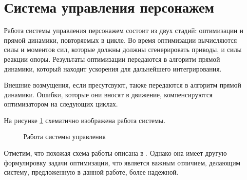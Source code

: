 
\section{Система управления персонажем}

Работа системы управления персонажем состоит из двух стадий: оптимизации и прямой динамики, повторяемых в цикле. Во время оптимизации вычисляются силы и моментов сил, которые должны должны сгенерировать приводы, и силы реакции опоры. Результаты оптимизации передаются в алгоритм прямой динамики, который находит ускорения для дальнейшего интегрирования.

Внешние возмущения, если пресутсвуют, также передаются в алгоритм прямой динамики. Ошибки, которые они вносят в движение, компенсируются оптимизатором на следующих циклах.

На рисунке \ref{fig:architecture} схематично изображена работа системы.

\begin{figure}[h]
  \begin{minipage}{\textwidth}
    \centering
    \caption{Работа системы управления}
    \label{fig:architecture}
  \end{minipage}
\end{figure}

Отметим, что похожая схема работы описана в \cite{AbeSP}. Однако она имеет другую формулировку задачи оптимизации, что является важным отличием, делающим систему, предложенную в данной работе, более надежной.


